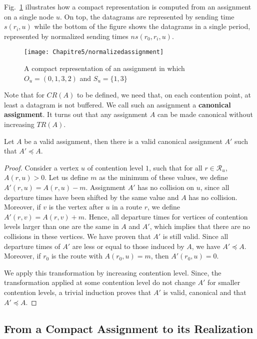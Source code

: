 Fig.~\ref{fig:normalizedassignment} illustrates how a compact representation is computed from an assignment on a single node $u$. On top, the datagrams are represented by sending time $s(r_i,u)$ while the bottom of the figure shows the datagrams in a single period, represented by normalized sending times $ns(r_0,r_i,u)$.  
\begin{figure}[!h]
	\centering
	\texttt{[image: Chapitre5/normalizedassignment]}
\caption{A compact representation of an assignment in which $O_u = (0,1,3,2)$ and $S_u = \{1,3\}$ }
\label{fig:normalizedassignment}
\end{figure}


Note that for $CR(A)$ to be defined, we need that, on each contention point, at least a datagram is not buffered. We call such an assignment a \textbf{canonical assignment}. It turns out that any assignment $A$ can be made canonical without increasing $TR(A)$.

\begin{lemma}\label{lemma:canonical_min}
Let $A$ be a valid assignment, then there is a valid canonical assignment $A'$ such that $A' \preceq A$.
\end{lemma}
\begin{proof}
Consider a vertex $u$ of contention level $1$, such that for all $r \in \mathcal{R}_u$, $A(r,u) > 0$. Let us define $m$ as the minimum of these values, we define $A'(r,u) = A(r,u) - m$. Assignment $A'$ has no collision on $u$, since all departure times have been shifted by the same value and $A$ has no collision. Moreover, if $v$ is the vertex after $u$ in a route $r$, we define  $A'(r,v) = A(r,v) + m$. Hence, all departure times for vertices of contention levels larger than one are the same in $A$ and $A'$, which implies that there are no collisions in these vertices. We have proven that $A'$ is still valid. Since all departure times of $A'$ are less or equal to those induced by $A$, we have $A' \preceq A$. Moreover, if $r_0$ is the route with $A(r_0,u) = m$, then $A'(r_0,u) = 0$. 

We apply this transformation by increasing contention level. Since, the transformation applied at some contention level do not change $A'$ for smaller contention levels, a trivial induction proves that $A'$ is valid, canonical and that $A' \preceq A$.
\end{proof}


\subsection{From a Compact Assignment to its Realization}\label{sec:real}


